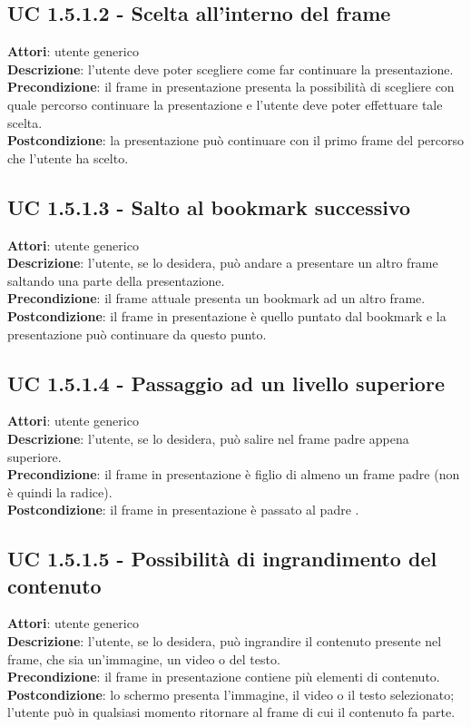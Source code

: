 	\subsection{UC 1.5.1.2 - Scelta all'interno del frame}{
		\label{uc1.5.1.2}
		\textbf{Attori}: utente generico \\
		\textbf{Descrizione}: l'utente deve poter scegliere come far continuare la presentazione. \\
		\textbf{Precondizione}: il frame in presentazione presenta la possibilità di scegliere con quale percorso continuare la presentazione e l'utente deve poter effettuare tale scelta.	\\
		\textbf{Postcondizione}: la presentazione può continuare con il primo frame del percorso che l'utente ha scelto.	\\
	}
	\subsection{UC 1.5.1.3 - Salto al bookmark successivo}{
		\label{uc1.5.1.3}
		\textbf{Attori}: utente generico \\
		\textbf{Descrizione}: l'utente, se lo desidera, può andare a presentare un altro frame saltando una parte della presentazione. \\
		\textbf{Precondizione}: il frame attuale presenta un bookmark ad un altro frame.	\\
		\textbf{Postcondizione}: il frame in presentazione è quello puntato dal bookmark e la presentazione può continuare da questo punto.	\\
	}
	\subsection{UC 1.5.1.4 - Passaggio ad un livello superiore}{
		\label{uc1.5.1.4}
		\textbf{Attori}: utente generico \\
		\textbf{Descrizione}: l'utente, se lo desidera, può salire nel frame padre appena superiore. \\
		\textbf{Precondizione}: il frame in presentazione è figlio di almeno un frame padre (non è quindi la radice).	\\
		\textbf{Postcondizione}: il frame in presentazione è passato al padre .	\\
	}
	\subsection{UC 1.5.1.5 - Possibilità di ingrandimento del contenuto}{
		\label{uc1.5.1.5}
		\textbf{Attori}: utente generico \\
		\textbf{Descrizione}: l'utente, se lo desidera, può ingrandire il contenuto presente nel frame, che sia un'immagine, un video o del testo. \\
		\textbf{Precondizione}: il frame in presentazione contiene più elementi di contenuto.	\\
		\textbf{Postcondizione}: lo schermo presenta l'immagine, il video o il testo selezionato; l'utente può in qualsiasi momento ritornare al frame di cui il contenuto fa parte.	\\
	}
